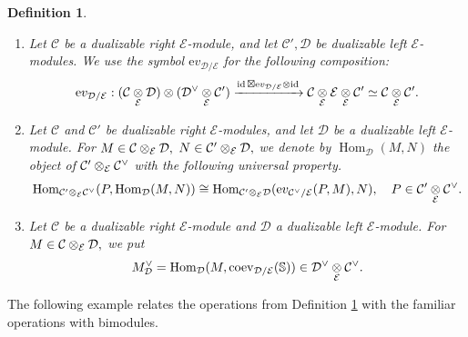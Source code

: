 \documentclass[11pt,leqno]{amsart}
\newtheorem{defi}[theo]{Definition}
\numberwithin{equation}{section}
\def\bS{\mathbb{S}}
\def\Hom{\operatorname{Hom}}
\newcommand{\tens}[1]{%
  \mathbin{\mathop{\otimes}\displaylimits_{#1}}%
}
\newcommand{\xto}{\xrightarrow}
\newcommand{\ev}{\mathrm ev}
\newcommand{\cD}{{\mathcal D}}
\newcommand{\cC}{{\mathcal C}}
\newcommand{\cE}{{\mathcal E}}
\newcommand{\id}{\operatorname{id}}
\newcommand{\coev}{\operatorname{coev}}
\begin{document}
\begin{defi}\label{def:operations_objects_tensor_products}
\begin{enumerate}[label=(\roman*),ref=(\roman*)]
\item Let $\cC$ be a dualizable right $\cE$-module, and let $\cC',\cD$ be dualizable left $\cE$-modules. We use the symbol $\ev_{\cD/\cE}$ for the following composition:
\begin{equation*}
\ev_{\cD/\cE}:(\cC\tens{\cE}\cD)\otimes (\cD^{\vee}\tens{\cE}\cC')\xto{\id\boxtimes\ev_{\cD/\cE}\otimes\id}\cC\tens{\cE}\cE\tens{\cE}\cC'\simeq \cC\tens{\cE}\cC'.
\end{equation*}
\label{ev_D/E}
\item Let $\cC$ and $\cC'$ be dualizable right $\cE$-modules, and let $\cD$ be a dualizable left $\cE$-module. For $M\in \cC\tens{\cE}\cD,$ $N\in\cC'\tens{\cE}\cD,$
we denote by $\Hom_{\cD}(M,N)$ the object of $\cC'\tens{\cE}\cC^{\vee}$ with the following universal property.
\begin{equation*}
\Hom_{\cC'\tens{\cE}\cC^{\vee}}(P,\Hom_{\cD}(M,N))\cong \Hom_{\cC'\tens{\cE}\cD}(\ev_{\cC^{\vee}/\cE}(P,M),N),\quad P\in\cC'\tens{\cE}\cC^{\vee}.
\end{equation*} \label{Hom_D}
\item Let $\cC$ be a dualizable right $\cE$-module and $\cD$ a dualizable left $\cE$-module. For $M\in \cC\tens{\cE}\cD,$ we put 
\begin{equation*}
M_{\cD}^{\vee} = \Hom_{\cD}(M,\coev_{\cD/\cE}(\bS))\in \cD^{\vee}\tens{\cE}\cC^{\vee}. 
\end{equation*}
\end{enumerate} \label{M_D^v}
\end{defi} 

The following example relates the operations from Definition \ref{def:operations_objects_tensor_products} with the familiar operations with bimodules.
\end{document}
